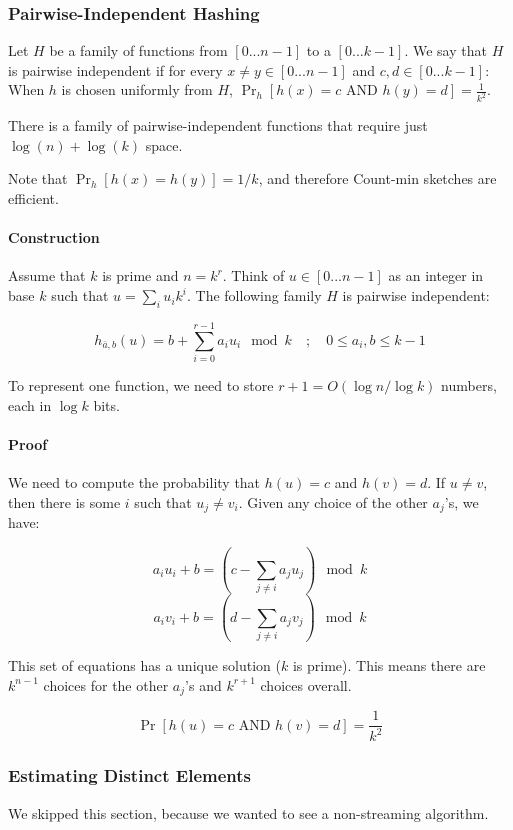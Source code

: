 \documentclass[a4paper]{article}
\begin{document}
\subsubsection{Pairwise-Independent Hashing}
Let $H$ be a family of functions from $[0...n-1]$ to a $[0...k-1]$.
We say that $H$ is pairwise independent if for every $x\ne y \in [0...n-1]$ and $c,d\in [0...k-1]$:
When $h$ is chosen uniformly from $H$, $\Pr_h[h(x)=c \text{ AND } h(y)=d]=\frac{1}{k^2}$.

There is a family of pairwise-independent functions that require just $\log(n)+\log(k)$ space.

Note that $\Pr_h[h(x) = h(y)] = 1/k$, and therefore Count-min sketches are efficient.

\paragraph{Construction}
Assume that $k$ is prime and $n=k^r$.
Think of $u\in [0...n-1]$ as an integer in base $k$ such that $u=\sum_i u_i k^i$.
The following family $H$ is pairwise independent:

\[h_{\bar{a},b}(u)=b+\sum_{i=0}^{r-1}a_i u_i \mod k \quad;\quad 0 \le a_i,b \le k-1\]


To represent one function, we need to store $r+1=O(\log n / \log k)$ numbers, each in $\log k$ bits.

\paragraph{Proof}
We need to compute the probability that $h(u)=c$ and $h(v)=d$.
If $u\ne v$, then there is some $i$ such that $u_j \ne v_i$.
Given any choice of the other $a_j$'s, we have:

\[a_i u_i+b=\left(c-\sum_{j\ne i} a_j u_j\right) \mod k\]
\[a_i v_i+b=\left(d-\sum_{j\ne i} a_j v_j\right) \mod k\]

This set of equations has a unique solution ($k$ is prime).
This means there are $k^{n-1}$ choices for the other $a_j$'s and $k^{r+1}$ choices overall.

\[\Pr[h(u)=c\text{ AND }h(v)=d]=\frac{1}{k^2}\]

\subsubsection{Estimating Distinct Elements}
We skipped this section, because we wanted to see a non-streaming algorithm.
\end{document}
